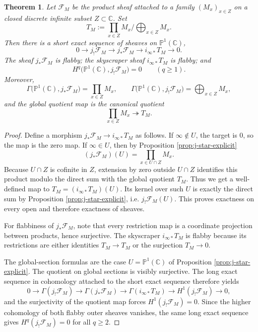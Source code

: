 \documentclass[11pt,a4paper]{article}
\newtheorem{theorem}{Theorem}[section]
\theoremstyle{definition}
\theoremstyle{remark}
\newcommand{\CC}{\mathbb C}
\newcommand{\PP}{\mathbb P}
\newcommand{\onto}{\twoheadrightarrow}
\begin{document}
\begin{theorem}\label{thm:tail-sequence-general}
Let $\mathcal F_M$ be the product sheaf attached to a family $(M_x)_{x\in Z}$ on a closed discrete infinite subset $Z\subset\CC$.  Set
\[
T_M:=\prod_{x\in Z}M_x\Big/\bigoplus_{x\in Z}M_x.
\]
Then there is a short exact sequence of sheaves on $\PP^1(\CC)$,
\[
0\longrightarrow j_!\mathcal F_M\longrightarrow j_*\mathcal F_M\longrightarrow i_{\infty *}T_M\longrightarrow0.
\]
The sheaf $j_*\mathcal F_M$ is flabby; the skyscraper sheaf $i_{\infty *}T_M$ is flabby; and
\[
H^q\bigl(\PP^1(\CC),j_!\mathcal F_M\bigr)=0
\qquad(q\ge1).
\]
Moreover,
\[
\Gamma\bigl(\PP^1(\CC),j_*\mathcal F_M\bigr)=\prod_{x\in Z}M_x,
\qquad
\Gamma\bigl(\PP^1(\CC),j_!\mathcal F_M\bigr)=\bigoplus_{x\in Z}M_x,
\]
and the global quotient map is the canonical quotient
\[
\prod_{x\in Z}M_x\onto T_M.
\]
\end{theorem}

\begin{proof}
Define a morphism $j_*\mathcal F_M\to i_{\infty *}T_M$ as follows.  If $\infty\notin U$, the target is $0$, so the map is the zero map.  If $\infty\in U$, then by Proposition \ref{prop:j-star-explicit}
\[
(j_*\mathcal F_M)(U)=\prod_{x\in U\cap Z}M_x.
\]
Because $U\cap Z$ is cofinite in $Z$, extension by zero outside $U\cap Z$ identifies this product modulo the direct sum with the global quotient $T_M$.  Thus we get a well-defined map to $T_M=(i_{\infty *}T_M)(U)$.  Its kernel over such $U$ is exactly the direct sum by Proposition \ref{prop:j-star-explicit}, i.e. $j_!\mathcal F_M(U)$.  This proves exactness on every open and therefore exactness of sheaves.

For flabbiness of $j_*\mathcal F_M$, note that every restriction map is a coordinate projection between products, hence surjective.  The skyscraper $i_{\infty *}T_M$ is flabby because its restrictions are either identities $T_M\to T_M$ or the surjection $T_M\to0$.

The global-section formulas are the case $U=\PP^1(\CC)$ of Proposition \ref{prop:j-star-explicit}.  The quotient on global sections is visibly surjective.  The long exact sequence in cohomology attached to the short exact sequence therefore yields
\[
0\to \Gamma(j_!\mathcal F_M)\to \Gamma(j_*\mathcal F_M)\to \Gamma(i_{\infty *}T_M)\to H^1(j_!\mathcal F_M)\to0,
\]
and the surjectivity of the quotient map forces $H^1(j_!\mathcal F_M)=0$.  Since the higher cohomology of both flabby outer sheaves vanishes, the same long exact sequence gives $H^q(j_!\mathcal F_M)=0$ for all $q\ge2$.
\end{proof}
\end{document}
